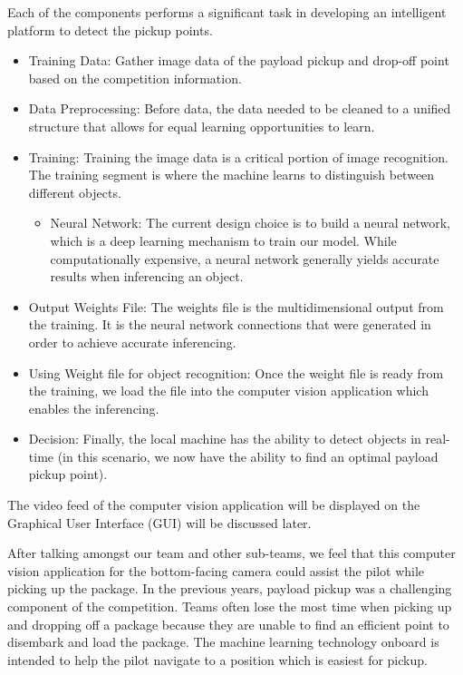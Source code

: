 \documentclass[onecolumn, oneside, letterpaper, draftclsnofoot, 10pt, compsoc]{IEEEtran}
\begin{document}
\noindent
Each of the components performs a significant task in developing an intelligent platform to detect the pickup points.
\begin{itemize}
    \item Training Data: Gather image data of the payload pickup and drop-off point based on the competition information.
    \item Data Preprocessing: Before data, the data needed to be cleaned to a unified structure that allows for equal learning opportunities to learn.
    \item Training: Training the image data is a critical portion of image recognition. The training segment is where the machine learns to distinguish between different objects.
    \begin{itemize}
        \item Neural Network: The current design choice is to build a neural network, which is a deep learning mechanism to train our model. While computationally expensive, a neural network generally yields accurate results when inferencing an object.
    \end{itemize}
    \item Output Weights File: The weights file is the multidimensional output from the training. It is the neural network connections that were generated in order to achieve accurate inferencing.
    \item Using Weight file for object recognition: Once the weight file is ready from the training, we load the file into the computer vision application which enables the inferencing.
    \item Decision: Finally, the local machine has the ability to detect objects in real-time (in this scenario, we now have the ability to find an optimal payload pickup point).
\end{itemize}

\noindent
The video feed of the computer vision application will be displayed on the Graphical User Interface (GUI) will be discussed later.

\noindent
After talking amongst our team and other sub-teams, we feel that this computer vision application for the bottom-facing camera could assist the pilot while picking up the package. In the previous years, payload pickup was a challenging component of the competition. Teams often lose the most time when picking up and dropping off a package because they are unable to find an efficient point to disembark and load the package. The machine learning technology onboard is intended to help the pilot navigate to a position which is easiest for pickup.
\end{document}
